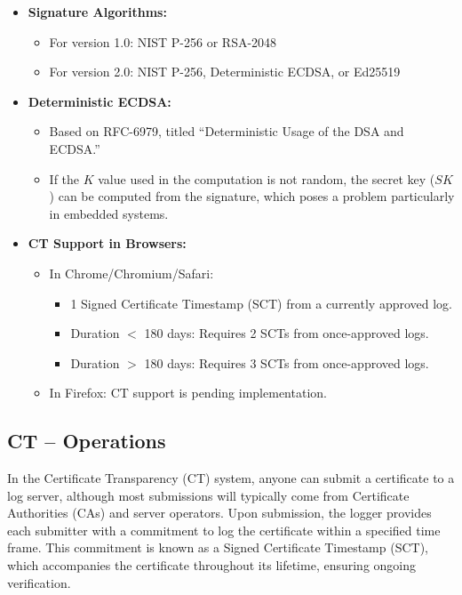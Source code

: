 \begin{itemize}
  \item \textbf{Signature Algorithms:}
    \begin{itemize}
      \item For version 1.0: NIST P-256 or RSA-2048
      \item For version 2.0: NIST P-256, Deterministic ECDSA, or
        Ed25519
    \end{itemize}

  \item \textbf{Deterministic ECDSA:} 
    \begin{itemize}
      \item Based on RFC-6979, titled “Deterministic Usage of the DSA
        and ECDSA.”
      \item If the $K$ value used in the computation is not random,
        the secret key ($SK$) can be computed from the signature,
        which poses a problem particularly in embedded systems.
    \end{itemize}

  \item \textbf{CT Support in Browsers:}
    \begin{itemize}
      \item In Chrome/Chromium/Safari:
        \begin{itemize}
          \item 1 Signed Certificate Timestamp (SCT) from a currently
            approved log.
          \item Duration $<$ 180 days: Requires 2 SCTs from
            once-approved logs.
          \item Duration $>$ 180 days: Requires 3 SCTs from
            once-approved logs.
        \end{itemize}
      \item In Firefox: CT support is pending implementation.
    \end{itemize}
\end{itemize}

\subsection{CT – Operations}

In the Certificate Transparency (CT) system, anyone can submit a
certificate to a log server, although most submissions will typically
come from Certificate Authorities (CAs) and server operators. Upon
submission, the logger provides each submitter with a commitment to
log the certificate within a specified time frame. This commitment is
known as a Signed Certificate Timestamp (SCT), which accompanies the
certificate throughout its lifetime, ensuring ongoing verification.

